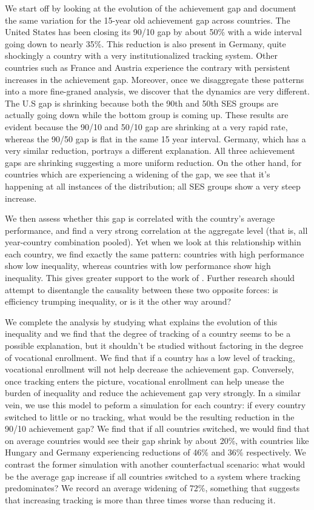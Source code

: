 \documentclass[11pt, a4paper]{article}\usepackage[]{graphicx}\usepackage[]{color}
\begin{document}
We start off by looking at the evolution of the achievement gap and document the same variation for the 15-year old achievement gap across countries. The United States has been closing its 90/10 gap by about 50\% with a wide interval going down to nearly 35\%. This reduction is also present in Germany, quite shockingly a country with a very institutionalized tracking system. Other countries such as France and Austria experience the contrary with persistent increases in the achievement gap. Moreover, once we disaggregate these patterns into a more fine-graned analysis, we discover that the dynamics are very different. The U.S gap is shrinking because both the 90th and 50th SES groups are actually going down while the bottom group is coming up. These results are evident because the 90/10 and 50/10 gap are shrinking at a very rapid rate, whereas the 90/50 gap is flat in the same 15 year interval. Germany, which has a very similar reduction, portrays a different explanation. All three achievement gaps are shrinking suggesting a more uniform reduction. On the other hand, for countries which are experiencing a widening of the gap, we see that it's happening at all instances of the distribution; all SES groups show a very steep increase.

We then assess whether this gap is correlated with the country's average performance, and find a very strong correlation at the aggregate level (that is, all year-country combination pooled). Yet when we look at this relationship within each country, we find exactly the same pattern: countries with high performance show low inequality, whereas countries with low performance show high inequality. This gives greater support to the work of \citet{werfhorst_mijs}. Further research should attempt to disentangle the causality between these two opposite forces: is efficiency trumping inequality, or is it the other way around?

We complete the analysis by studying what explains the evolution of this inequality and we find that the degree of tracking of a country seems to be a possible explanation, but it shouldn't be studied without factoring in the degree of vocational enrollment. We find that if a country has a low level of tracking, vocational enrollment will not help decrease the achievement gap. Conversely, once tracking enters the picture, vocational enrollment can help unease the burden of inequality and reduce the achievement gap very strongly. In a similar vein, we use this model to peform a simulation for each country: if every country switched to little or no tracking, what would be the resulting reduction in the 90/10 achievement gap? We find that if all countries switched, we would find that on average countries would see their gap shrink by about 20\%, with countries like Hungary and Germany experiencing reductions of 46\% and 36\% respectively. We contrast the former simulation with another counterfactual scenario: what would be the average gap increase if all countries switched to a system where tracking predominates? We record an average widening of 72\%, something that suggests that increasing tracking is more than three times worse than reducing it.
\end{document}
